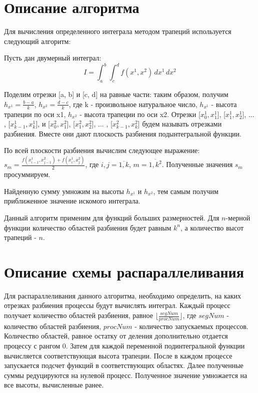 \documentclass{report}
\begin{document}
\section*{Описание алгоритма}
\par Для вычисления определенного интеграла методом трапеций используется следующий алгоритм:
\par Пусть дан двумерный интеграл: $$I = {\int_a^b \int_c^d} f(x^1, x^2) \,dx^1\,dx^2$$
\par Поделим отрезки [a, b] и [c, d] на равные части: таким образом, получим $h_{x^1} = \frac{b - a}{k}$, $h_{x^2} = \frac{d - c}{k}$, где k - произвольное натуральное число, $h_{x^1}$ - высота трапеции по оси x1, $h_{x^2}$ - высота трапеции по оси x2. Отрезки [$x^1_0, x^1_1$], [$x^1_1, x^1_2$], ... , [$x^1_{k-1}, x^1_k$], и [$x^2_0, x^2_1$], [$x^2_1, x^2_2$], ... , [$x^2_{k-1}, x^2_k$] будем называть отрезками разбиения. Вместе они дают плоскость разбиения подынтегральной функции.
\par По всей плоскости разбиения вычислим следующее выражение: $s_m = \frac{f(x^1_{i-1}, x^2_{j-1}) + f(x^1_{i}, x^2_{j})}{2}$, где $i, j = \overline{1, k}$, $m = \overline{1, k^2}$. Полученные значения $s_m$ просуммируем.
\par Найденную сумму умножим на высоты $h_{x^1}$ и $h_{x^2}$, тем самым получим приближенное значение искомого интеграла.
\par Данный алгоритм применим для функций больших размерностей. Для $n$-мерной функции количество областей разбиения будет равным $k^n$, а количество высот трапеций - $n$.
\newpage

\section*{Описание схемы распараллеливания}
\par Для распараллеливания данного алгоритма, необходимо определить, на каких отрезках разбиения процессы будут вычислять интеграл. Каждый процесс получает количество областей разбиения, равное $\lfloor\frac{segNum}{procNum}\rfloor$, где $segNum$ - количество областей разбиения, $procNum$ - количество запускаемых процессов. Количество областей, равное остатку от деления дополнительно отдается процессу с рангом 0. Затем для каждой переменной подинтегральной функции вычисляется соответствующая высота трапеции. После в каждом процессе запускается подсчет функций в соответствующих областях. Далее полученные суммы редуцируются на нулевой процесс. Полученное значение умножается на все высоты, вычисленные ранее.
\newpage
\end{document}
